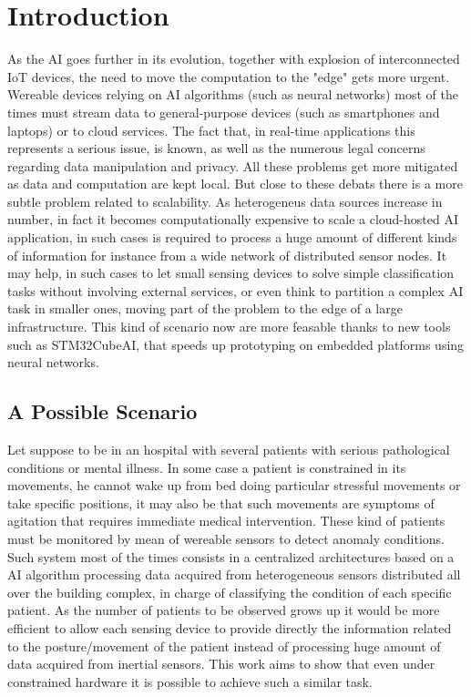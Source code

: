 \section{Introduction}
As the AI goes further in its evolution, together with explosion of interconnected IoT devices, the need to move the computation to the "edge" gets more urgent. Wereable devices relying on AI algorithms (such as neural networks) most of the times must stream data to general-purpose devices (such as smartphones and laptops) or to cloud services. The fact that, in real-time applications this represents a serious issue, is known, as well as the numerous legal concerns regarding data manipulation and privacy. All these problems get more mitigated as data and computation are kept local. But close to these debats there is a more subtle problem related to scalability. As heterogeneus data sources increase in number, in fact it becomes computationally expensive to scale a cloud-hosted AI application, in such cases is required to process a huge amount of different kinds of information for instance from a wide network of distributed sensor nodes. It may help, in such cases to let small sensing devices to solve simple classification tasks without involving external services, or even think to partition a complex AI task in smaller ones, moving part of the problem to the edge of a large infrastructure. This kind of scenario now are more feasable thanks to new tools such as STM32CubeAI, that speeds up prototyping on embedded platforms using neural networks.

\subsection{A Possible Scenario}
Let suppose to be in an hospital with several patients with serious pathological conditions or mental illness. In some case a patient is constrained in its movements, he cannot wake up from bed doing particular stressful movements or take specific positions, it may also be  that such movements are symptoms of agitation that requires immediate medical intervention. These kind of patients must be monitored by mean of wereable sensors to detect anomaly conditions. Such system most of the times consists in a centralized architectures based on a AI algorithm processing data acquired from heterogeneous sensors distributed all over the building complex, in charge of classifying the condition of each specific patient. As the number of patients to be observed grows up it would be more efficient to allow each sensing device to provide directly the information related to the posture/movement of the patient instead of processing huge amount of data acquired from inertial sensors. This work aims to show that even under constrained hardware it is possible to achieve such a similar task.


